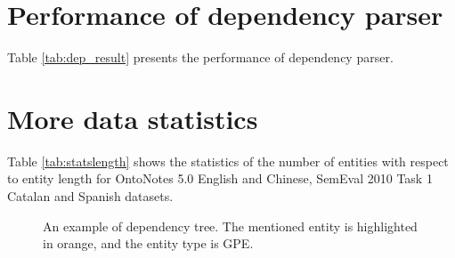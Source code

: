 \documentclass[11pt]{article}
\begin{document}
\section{Performance of dependency parser}
Table \ref{tab:dep_result} presents the performance of dependency parser.


\section{More data statistics}
Table \ref{tab:statslength} shows the statistics of the number of entities with respect to entity length for OntoNotes 5.0 English and Chinese, SemEval 2010 Task 1 Catalan and Spanish datasets.


\begin{figure*}
    \centering
    \caption{An example of dependency tree. The mentioned entity is highlighted in orange, and the entity type is GPE.}
    \label{fig:dependency}
\end{figure*}
\end{document}
